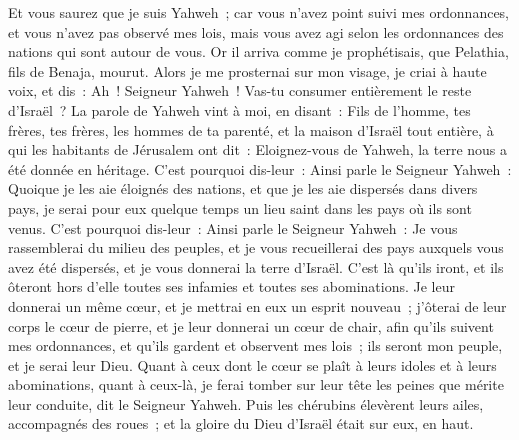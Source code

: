 \begin{multicols}{2}
Et vous saurez que je suis Yahweh~; car vous n'avez point suivi mes ordonnances, et vous n'avez pas observé mes lois, mais vous avez agi selon les ordonnances des nations qui sont autour de vous.
Or il arriva comme je prophétisais, que Pelathia, fils de Benaja, mourut. Alors je me prosternai sur mon visage, je criai à haute voix, et dis~: Ah~! Seigneur Yahweh~! Vas-tu consumer entièrement le reste d'Israël~?
La parole de Yahweh vint à moi, en disant~:
Fils de l'homme, tes frères, tes frères, les hommes de ta parenté, et la maison d'Israël tout entière, à qui les habitants de Jérusalem ont dit~: Eloignez-vous de Yahweh, la terre nous a été donnée en héritage.
C'est pourquoi dis-leur~: Ainsi parle le Seigneur Yahweh~: Quoique je les aie éloignés des nations, et que je les aie dispersés dans divers pays, je serai pour eux quelque temps un lieu saint dans les pays où ils sont venus.
C'est pourquoi dis-leur~: Ainsi parle le Seigneur Yahweh~: Je vous rassemblerai du milieu des peuples, et je vous recueillerai des pays auxquels vous avez été dispersés, et je vous donnerai la terre d'Israël.
C'est là qu'ils iront, et ils ôteront hors d'elle toutes ses infamies et toutes ses abominations.
Je leur donnerai un même cœur, et je mettrai en eux un esprit nouveau~; j'ôterai de leur corps le cœur de pierre, et je leur donnerai un cœur de chair,
afin qu'ils suivent mes ordonnances, et qu'ils gardent et observent mes lois~; ils seront mon peuple, et je serai leur Dieu.
Quant à ceux dont le cœur se plaît à leurs idoles et à leurs abominations, quant à ceux-là, je ferai tomber sur leur tête les peines que mérite leur conduite, dit le Seigneur Yahweh.
Puis les chérubins élevèrent leurs ailes, accompagnés des roues~; et la gloire du Dieu d'Israël était sur eux, en haut.

\end{multicols}
